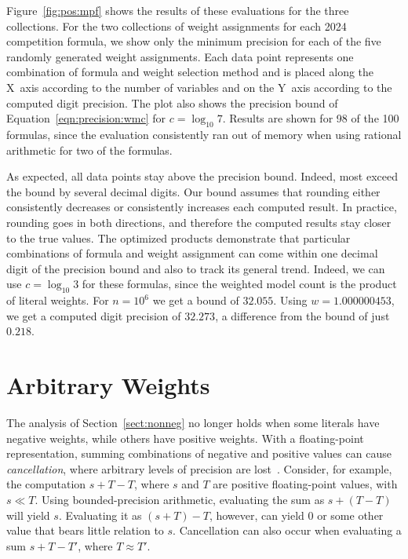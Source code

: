 \documentclass[letterpaper,USenglish,cleveref, autoref, thm-restate]{lipics-v2021}
\begin{document}
Figure~\ref{fig:pos:mpf} shows the results of these evaluations for
the three collections.  For the two collections of weight assignments for each 2024 competition formula,
we show only the minimum precision for each of the five randomly
generated  weight assignments.  Each data point
represents one combination of formula and weight selection method and is placed
along the X~axis according to the number of variables
and on the Y~axis according to the computed digit precision.
The plot also shows the precision bound of Equation~\ref{eqn:precision:wmc} for $c=\log_{10} 7$.
Results are shown for 98 of the 100 formulas, since the evaluation consistently ran out of memory when using rational arithmetic for two of the formulas.

As  expected, all data points stay above the precision bound.
Indeed, most exceed the bound by several decimal digits.  Our bound
assumes that rounding either consistently decreases or consistently
increases each computed result.  In practice, rounding goes in both
directions, and therefore the computed results stay closer to the true
values.  The optimized products demonstrate that particular
combinations of formula and weight assignment can come within one
decimal digit of the precision bound and also to track its general
trend.  Indeed, we can use $c = \log_{10} 3$ for these formulas,
since the weighted model count is the product of literal weights.
For $n=10^6$ we get a bound of $32.055$.
Using $w=1.000000453$, we get
a computed digit precision of $32.273$, a difference from the bound of just $0.218$.

\section{Arbitrary Weights}
\label{sect:neg}

The analysis of Section~\ref{sect:nonneg} no longer holds when
some literals have negative weights, while others have positive weights.  With a floating-point
representation, summing combinations of negative and positive
values can cause \emph{cancellation}, where arbitrary levels of
precision are lost~\cite{knuth:fp:1981}.  Consider, for example, the computation
$s + T - T$, where $s$ and $T$ are positive floating-point values, with $s \ll T$.  Using
bounded-precision arithmetic, evaluating the sum as $s + (T - T)$ will yield $s$.
Evaluating it as $(s + T) - T$, however, can yield $0$ or some other value that bears little relation to $s$.
Cancellation can also occur when evaluating a sum $s + T - T'$, where $T \approx T'$.
\end{document}
